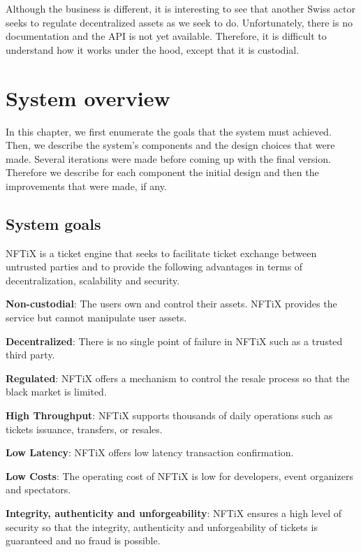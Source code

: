 \documentclass[a4paper,11pt,oneside]{report}
\begin{document}
Although the business is different, it is interesting to see that another Swiss actor seeks to regulate decentralized assets as we seek to do. Unfortunately, there is no documentation and the API is not yet available. Therefore, it is difficult to understand how it works under the hood, except that it is custodial.

\chapter{System overview}
In this chapter, we first enumerate the goals that the system must achieved. Then, we describe the system's components and the design choices that were made. Several iterations were made before coming up with the final version. Therefore we describe for each component the initial design and then the improvements that were made, if any.

\section{System goals}

NFTiX is a ticket engine that seeks to facilitate ticket exchange between untrusted parties and to provide the following advantages in terms of decentralization, scalability and security.

\begin{description}
  \item \textbf{Non-custodial}: The users own and control their assets. NFTiX provides the service but cannot manipulate user assets.
  \item \textbf{Decentralized}: There is no single point of failure in NFTiX such as a trusted third party.
  \item \textbf{Regulated}: NFTiX offers a mechanism to control the resale process so that the black market is limited.
  \item \textbf{High Throughput}: NFTiX supports thousands of daily operations such as tickets issuance, transfers, or resales.
  \item \textbf{Low Latency}: NFTiX offers low latency transaction confirmation.
  \item \textbf{Low Costs}: The operating cost of NFTiX is low for developers, event organizers and spectators.
  \item \textbf{Integrity, authenticity and unforgeability}: NFTiX ensures a high level of security so that the integrity, authenticity and unforgeability of tickets is guaranteed and no fraud is possible.
\end{description}
\end{document}
